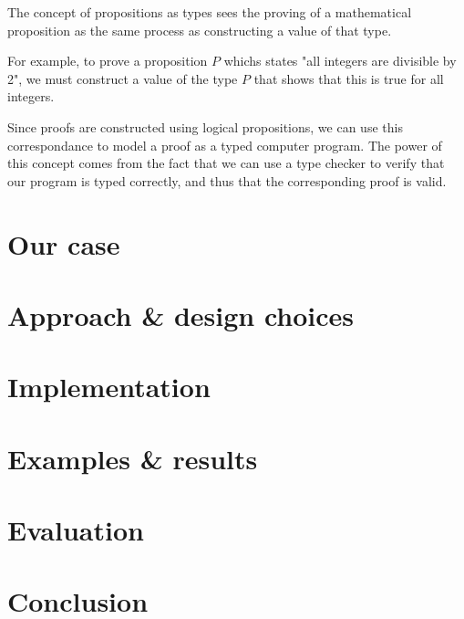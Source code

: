 \documentclass[a4paper,14pt]{article}
\begin{document}
The concept of propositions as types sees the proving of a mathematical proposition
as the same process as constructing a value of that type.

For example, to prove a proposition $P$ whichs states "all integers are divisible by 2",
we must construct a value of the type $P$ that shows that this is true for all integers.

Since proofs are constructed using logical propositions, we can use this correspondance
to model a proof as a typed computer program.
The power of this concept comes from the fact that we can use a type checker to verify that
our program is typed correctly, and thus that the corresponding proof is valid.

\section{Our case}

\section{Approach \& design choices}

\section{Implementation}

\section{Examples \& results}

\section{Evaluation}

\section{Conclusion}
\end{document}
